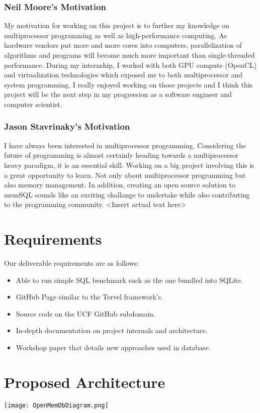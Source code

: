 \documentclass[letterpaper]{article}
\begin{document}
  \subsubsection{Neil Moore's Motivation}
  My motivation for working on this project is to further my knowledge on multiprocessor programming as well as high-performance computing.  
  As hardware vendors put more and more cores into computers, parallelization of algorithms and programs will become much more important than
  single-threaded performance. During my internship, I worked with both GPU compute (OpenCL) and virtualization technologies which exposed me
  to both multiprocessor and system programming. I really enjoyed working on those projects and I think this project will be the next step 
  in my progression as a software engineer and computer scientist.
  \subsubsection{Jason Stavrinaky's Motivation}
  I have always been interested in multiprocessor programming. Considering the future of programming is almost certainly heading towards a
  multiprocessor heavy paradigm, it is an essential skill. Working on a big project involving this is a great opportunity to learn. Not only
  about multiprocessor programming but also memory management. In addition, creating an open source solution to memSQL sounds like an exciting
  challange to undertake while also contributing to the programming community.
  \textless Insert actual text here\textgreater
  
  \section{Requirements}
  Our deliverable requirements are as follows:
  \begin{itemize}
   \item Able to run simple SQL benchmark such as the one bundled into SQLite.
   \item GitHub Page similar to the Tervel framework's.
   \item Source code on the UCF GitHub subdomain.
   \item In-depth documentation on project internals and architecture.
   \item Workshop paper that details new approaches used in database.
  \end{itemize}
  
  \section{Proposed Architecture}
  \texttt{[image: OpenMemDbDiagram.png]}
  
\end{document}
